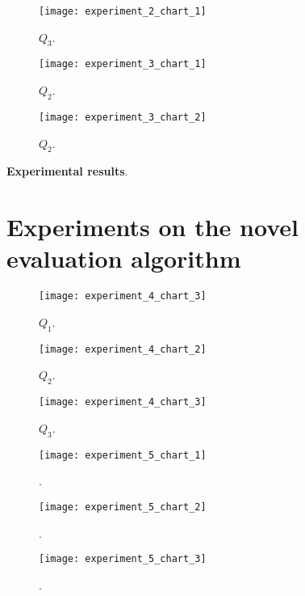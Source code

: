 \begin{figure}[H]
  \centering
  \texttt{[image: experiment\_2\_chart\_1]}
  \caption{$Q_{3}$.}
  \label{fig:???}
\end{figure}



\begin{figure}[H]
  \centering
  \texttt{[image: experiment\_3\_chart\_1]}
  \caption{$Q_{2}$.}
  \label{fig:???}
\end{figure}

\begin{figure}[H]
  \centering
  \texttt{[image: experiment\_3\_chart\_2]}
  \caption{$Q_{2}$.}
  \label{fig:???}
\end{figure}

\textbf{Experimental results}.

\section{Experiments on the novel evaluation algorithm}\label{sec:new-algorithm}

\begin{figure}[H]
  \centering
  \texttt{[image: experiment\_4\_chart\_3]}
  \caption{$Q_{1}$.}
  \label{fig:???}
\end{figure}
\begin{figure}[H]
  \centering
  \texttt{[image: experiment\_4\_chart\_2]}
  \caption{$Q_{2}$.}
  \label{fig:???}
\end{figure}
\begin{figure}[H]
  \centering
  \texttt{[image: experiment\_4\_chart\_3]}
  \caption{$Q_{3}$.}
  \label{fig:???}
\end{figure}


\begin{figure}[H]
  \centering
  \texttt{[image: experiment\_5\_chart\_1]}
  \caption{.}
  \label{fig:???}
\end{figure}

\begin{figure}[H]
  \centering
  \texttt{[image: experiment\_5\_chart\_2]}
  \caption{.}
  \label{fig:???}
\end{figure}

\begin{figure}[H]
  \centering
  \texttt{[image: experiment\_5\_chart\_3]}
  \caption{.}
  \label{fig:???}
\end{figure}

